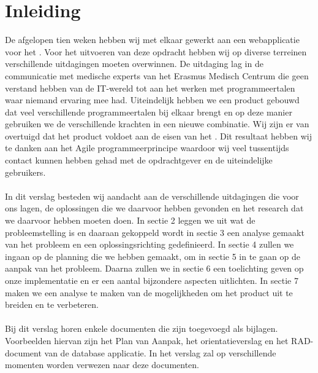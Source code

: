\section{Inleiding}
\label{inleiding}
De afgelopen tien weken hebben wij met elkaar gewerkt aan een webapplicatie voor het \casamproject. 
Voor het uitvoeren van deze opdracht hebben wij op diverse terreinen verschillende uitdagingen moeten overwinnen. 
De uitdaging lag in de communicatie met medische experts van het Erasmus Medisch Centrum die geen verstand hebben van de IT-wereld tot aan het werken met programmeertalen waar niemand ervaring mee had. 
Uiteindelijk hebben we een product gebouwd dat veel verschillende programmeertalen bij elkaar brengt en op deze manier gebruiken we de verschillende krachten in een nieuwe combinatie. 
Wij zijn er van overtuigd dat het product voldoet aan de eisen van het \casamproject. 
Dit resultaat hebben wij te danken aan het Agile programmeerprincipe waardoor wij veel tussentijds contact kunnen hebben gehad met de opdrachtgever en de uiteindelijke gebruikers.
\\
\\
In dit verslag besteden wij aandacht aan de verschillende uitdagingen die voor ons lagen, de oplossingen die we daarvoor hebben gevonden en het research dat we daarvoor hebben moeten doen. 
In sectie 2 leggen we uit wat de probleemstelling is en daaraan gekoppeld wordt in sectie 3 een analyse gemaakt van het probleem en een oplossingsrichting gedefinieerd. 
In sectie 4 zullen we ingaan op de planning die we hebben gemaakt, om in sectie 5 in te gaan op de aanpak van het probleem. 
Daarna zullen we in sectie 6 een toelichting geven op onze implementatie en er een aantal bijzondere aspecten uitlichten. 
In sectie 7 maken we een analyse te maken van de mogelijkheden om het product uit te breiden en te verbeteren. 
\\
\\
Bij dit verslag horen enkele documenten die zijn toegevoegd als bijlagen. 
Voorbeelden hiervan zijn het Plan van Aanpak, het orientatieverslag en het RAD-document van de database applicatie. 
In het verslag zal op verschillende momenten worden verwezen naar deze documenten. 
